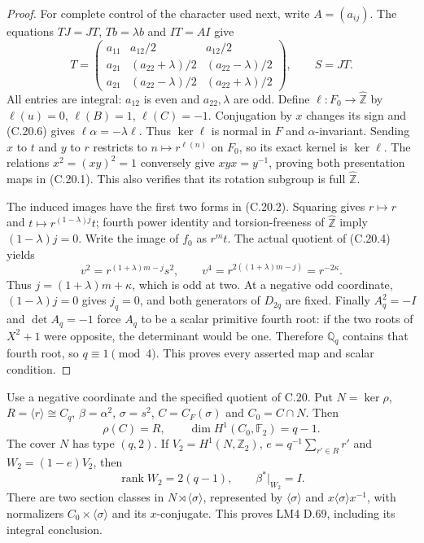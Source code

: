 \begin{proof}
For complete control of the character used next, write
$A=(a_{ij})$.  The equations $TJ=JT$, $Tb=\lambda b$
and $IT=AI$ give
\[
 T=\begin{pmatrix}
 a_{11}&a_{12}/2&a_{12}/2\\
 a_{21}&(a_{22}+\lambda)/2&(a_{22}-\lambda)/2\\
 a_{21}&(a_{22}-\lambda)/2&(a_{22}+\lambda)/2
 \end{pmatrix},\qquad S=JT.                               \tag{C.20.6}
\]
All entries are integral: $a_{12}$ is even and
$a_{22},\lambda$ are odd.  Define
$\ell:F_0\to\widehat{\mathbb Z}$ by
$\ell(u)=0$, $\ell(B)=1$, $\ell(C)=-1$.
Conjugation by $x$ changes its sign and (C.20.6) gives
$\ell\alpha=-\lambda\ell$.  Thus $\ker\ell$ is normal
in $F$ and $\alpha$-invariant.  Sending $x$ to $t$ and
$y$ to $r$ restricts to $n\mapsto r^{\ell(n)}$ on
$F_0$, so its exact kernel is $\ker\ell$.
The relations $x^2=(xy)^2=1$ conversely give
$xyx=y^{-1}$, proving both presentation maps in
(C.20.1).  This also verifies that its rotation
subgroup is full $\widehat{\mathbb Z}$.

The induced images have the first two forms in
(C.20.2).  Squaring gives $r\mapsto r$ and
$t\mapsto r^{(1-\lambda)j}t$; fourth power identity
and torsion-freeness of $\widehat{\mathbb Z}$ imply
$(1-\lambda)j=0$.  Write the image of $f_0$ as
$r^mt$.  The actual quotient of (C.20.4) yields
\[
 v^2=r^{(1+\lambda)m-j}s^2,\qquad
 v^4=r^{2((1+\lambda)m-j)}=r^{-2\kappa}.
\]
Thus $j=(1+\lambda)m+\kappa$, which is odd at two.
At a negative odd coordinate, $(1-\lambda)j=0$
gives $j_q=0$, and both generators of $D_{2q}$
are fixed.  Finally $A_q^2=-I$ and
$\det A_q=-1$ force $A_q$ to be a scalar primitive
fourth root: if the two roots of $X^2+1$ were
opposite, the determinant would be one.  Therefore
$\mathbb Q_q$ contains that fourth root, so
$q\equiv1\pmod4$.  This proves every asserted map
and scalar condition.
\end{proof}

Use a negative coordinate and the specified quotient of
C.20.  Put $N=\ker\rho$, $R=\langle r\rangle\cong C_q$,
$\beta=\alpha^2$, $\sigma=s^2$, $C=C_F(\sigma)$ and
$C_0=C\cap N$.  Then
\[
 \rho(C)=R,\qquad \dim H^1(C_0,\mathbb F_2)=q-1.
                                                               \tag{C.21.1}
\]
The cover $N$ has type $(q,2)$.  If
$V_2=H^1(N,\mathbb Z_2)$, $e=q^{-1}\sum_{r'\in R}r'$
and $W_2=(1-e)V_2$, then
\[
 \operatorname{rank}W_2=2(q-1),\qquad \beta^*|_{W_2}=I.
                                                               \tag{C.21.2}
\]
There are two section classes in $N\rtimes\langle\sigma\rangle$,
represented by $\langle\sigma\rangle$ and
$x\langle\sigma\rangle x^{-1}$, with normalizers
$C_0\times\langle\sigma\rangle$ and its $x$-conjugate.
This proves LM4 D.69, including its integral conclusion.

